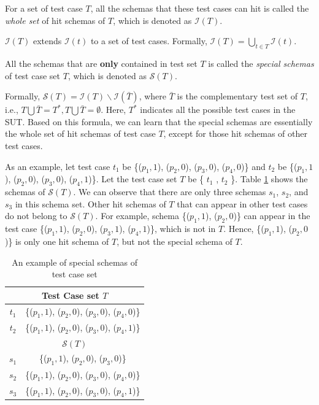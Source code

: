 \begin{definition} \label{de:allschemasoft}
For a set of test case $T$, all the schemas that these test cases can hit is called the \emph{whole set} of hit schemas of $T$, which is denoted as $\mathcal{I}(T)$.
\end{definition}

$\mathcal{I}(T)$ extends $\mathcal{I}(t)$ to a set of test cases. Formally, $\mathcal{I}(T) = \bigcup_{t \in T} \mathcal{I}(t)$.


\begin{definition} \label{de:specialschema}
All the schemas that are \textbf{only} contained in test set $T$ is called the \emph{special schemas} of test case set $T$, which is denoted as  $\mathcal{S}(T)$.
\end{definition}

Formally, $\mathcal{S}(T) =  \mathcal{I}(T) \backslash \mathcal{I}(\bar{T}) $, where $\bar{T}$ is the complementary test set of $T$, i.e., $T \bigcup \bar{T} = T^{*}, T \bigcup \bar{T} = \emptyset$. Here, $T^{*}$ indicates all the possible test cases in the SUT. Based on this formula, we can learn that the special schemas are essentially the whole set of hit schemas of test case $T$, except for those hit schemas of other test cases.

As an example, let test case $t_{1}$ be \{($p_{1}, 1$), ($p_{2}, 0$), ($p_{3}, 0$), ($p_{4}, 0$)\} and $t_{2}$ be \{($p_{1}, 1$), ($p_{2}, 0$), ($p_{3}, 0$), ($p_{4}, 1$)\}. Let the test case set $T$ be \{ $t_{1}$ , $t_{2}$ \}. Table \ref{ex:specialschemasoftestset} shows the schemas of $\mathcal{S}(T)$. We can observe that there are only three schemas $s_{1}$, $s_{2}$, and $s_{3}$ in this schema set. Other hit schemas of $T$ that can appear in other test cases do not belong to $\mathcal{S}(T)$. For example, schema \{($p_{1}, 1$), ($p_{2}, 0$)\} can appear in the test case \{($p_{1}, 1$), ($p_{2}, 0$), ($p_{3}, 1$), ($p_{4}, 1$)\}, which is not in $T$. Hence, \{($p_{1}, 1$), ($p_{2}, 0$)\} is only one hit schema of $T$, but not the special schema of $T$.

\begin{table}[htbp]
  \centering
  \caption{An example of special schemas of test case set}
      \label{ex:specialschemasoftestset}
    \begin{tabular}{|c|c|} \hline
  \multicolumn{2}{|c|}{\textbf{Test Case set $T$}} \\ \hline
  $t_{1}$ & \{($p_{1}, 1$), ($p_{2}, 0$), ($p_{3}, 0$), ($p_{4}, 0$)\}\\
  $t_{2}$ & \{($p_{1}, 1$), ($p_{2}, 0$), ($p_{3}, 0$), ($p_{4}, 1$)\}\\ \hline
  \multicolumn{2}{|c|}{\textbf{ $\mathcal{S}(T)$ }}  \\ \hline
  $s_{1}$ & \{($p_{1}, 1$), ($p_{2}, 0$), ($p_{3}, 0$)\}  \\
  $s_{2}$ & \{($p_{1}, 1$), ($p_{2}, 0$), ($p_{3}, 0$), ($p_{4}, 0$)\} \\
  $s_{3}$ & \{($p_{1}, 1$), ($p_{2}, 0$), ($p_{3}, 0$), ($p_{4}, 1$)\} \\ \hline
    \end{tabular}%
\end{table}%


